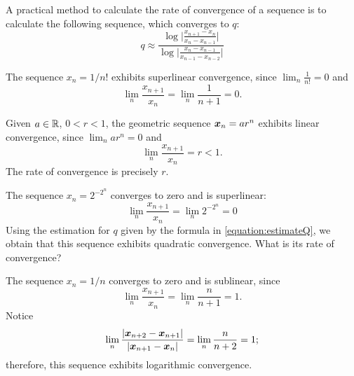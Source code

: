 A practical method to calculate the rate of convergence of a sequence is to calculate the following sequence, which converges to $q$:
\begin{equation}\label{equation:estimateQ}
q \approx \frac{\log\big\lvert \frac{x_{n+1}-x_n}{x_n-x_{n-1}} \big\rvert}{\log\big\lvert \frac{x_n-x_{n-1}}{x_{n-1}-x_{n-2}} \big\rvert}
\end{equation}

\begin{example}
The sequence $x_n = 1/n!$ exhibits superlinear convergence, since $\lim_n \frac{1}{n!}=0$ and 
\begin{equation*}
\lim_n \frac{x_{n+1}}{x_n} = \lim_n \frac{1}{n+1} = 0.
\end{equation*}
\end{example}

\begin{example}
Given $a \in \mathbb{R}$, $0<r<1$, the geometric sequence $\boldsymbol{x}_n = ar^n$ exhibits linear convergence, since $\lim_n ar^n = 0$ and
\begin{equation*}
\lim_n \frac{x_{n+1}}{x_n} = r < 1.
\end{equation*}
The rate of convergence is precisely $r$.
\end{example}

\begin{example}
The sequence $x_n = 2^{-2^n}$ converges to zero and is superlinear:
\begin{equation*}
\lim_n \frac{x_{n+1}}{x_n} = \lim_n 2^{-2^n} = 0
\end{equation*}
Using the estimation for $q$ given by the formula in \eqref{equation:estimateQ}, we obtain that this sequence exhibits quadratic convergence.  What is its rate of convergence?
\end{example}

\begin{example}
The sequence $x_n = 1/n$ converges to zero and is sublinear, since
\begin{equation*}
\lim_n \frac{x_{n+1}}{x_n} = \lim_n \frac{n}{n+1} = 1.
\end{equation*}
Notice 
\begin{equation*}
\lim_n \frac{\lvert \boldsymbol{x}_{n+2} - \boldsymbol{x}_{n+1} \rvert}{\lvert \boldsymbol{x}_{n+1} - \boldsymbol{x}_n \rvert} = \lim_n \frac{n}{n+2} = 1;
\end{equation*}
therefore, this sequence exhibits logarithmic convergence.
\end{example}
